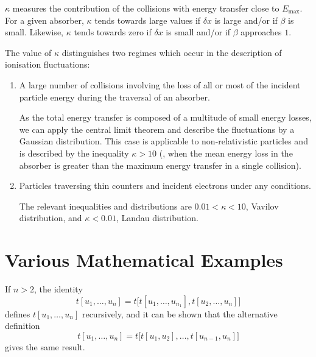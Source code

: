 $\kappa$ measures the contribution of the collisions with energy
transfer close to $E_{\mathrm{max}}$.  For a given absorber, $\kappa$
tends
towards large values if $\delta x$ is large and/or if $\beta$ is
small.  Likewise, $\kappa$ tends towards zero if $\delta x $ is small
and/or if $\beta$ approaches $1$.

The value of $\kappa$ distinguishes two regimes which occur in the
description of ionisation fluctuations:

\begin{enumerate}
\item A large number of collisions involving the loss of all or most
  of the incident particle energy during the traversal of an absorber.

  As the total energy transfer is composed of a multitude of small
  energy losses, we can apply the central limit theorem and describe
  the fluctuations by a Gaussian distribution.  This case is
  applicable to non-relativistic particles and is described by the
  inequality $\kappa > 10 $ (\ie, when the mean energy loss in the
  absorber is greater than the maximum energy transfer in a single
  collision).

\item Particles traversing thin counters and incident electrons under
  any conditions.

  The relevant inequalities and distributions are $ 0.01 < \kappa < 10
  $,
  Vavilov distribution, and $\kappa < 0.01 $, Landau distribution.
\end{enumerate}


\section{Various Mathematical Examples}
If $n > 2$, the identity
\[
  t[u_1,\dots,u_n] = t\bigl[t[u_1,\dots,u_{n_1}], t[u_2,\dots,u_n]
  \bigr]
\]
defines $t[u_1,\dots,u_n]$ recursively, and it can be shown that the
alternative definition
\[
  t[u_1,\dots,u_n] = t\bigl[t[u_1,u_2],\dots,t[u_{n-1},u_n]\bigr]
\]
gives the same result.  


